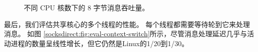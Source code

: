 \begin{figure}[htbp]
	
	\caption{不同 CPU 核数下的 8 字节消息吞吐量。}
	\label{socksdirect:fig:eval-corenum-tput}
\end{figure}




最后，我们评估共享核心的多个线程的性能。 每个线程都需要等待轮到它来处理消息。
如图 \ref {socksdirect:fig:eval-context-switch}所示，尽管消息处理延迟几乎与活动进程的数量呈线性增长，但它仍然是Linux的1/20到1/30。



